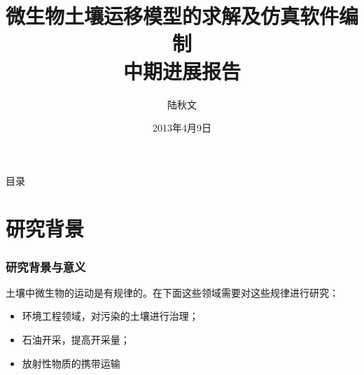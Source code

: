 \documentclass[xcolor=dvipsnames]{beamer}
\title[微生物土壤运移模型的求解]{\kaishu 微生物土壤运移模型的求解及仿真软件编制\\中期进展报告}
\author{陆秋文}
\institute[北京化工大学]{北京化工大学生命科学与技术学院}
\date{2013年4月9日}
\begin{document}
\begin{frame}
\titlepage
\end{frame}
\begin{frame}{目录}
\tableofcontents
\end{frame}
\section{研究背景}
	\begin{frame}
	\frametitle{研究背景与意义}
	土壤中微生物的运动是有规律的。在下面这些领域需要对这些规律进行研究：
	\begin{itemize}
	\fangsong
	\item 环境工程领域，对污染的土壤进行治理；
	\item 石油开采，提高开采量；
	\item 放射性物质的携带运输
	\end{itemize}
	\end{frame}
\end{document}
